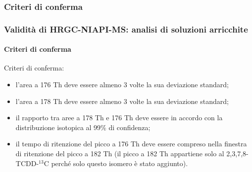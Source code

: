 \begin{frame}
\begin{description}
\end{description}

\end{frame}
\logo{}
\subsubsection{Criteri di conferma}\begin{frame}\frametitle{Validità di HRGC-NIAPI-MS: analisi di soluzioni arricchite}\framesubtitle{Criteri di conferma}


Criteri di conferma:\pause

\begin{itemize}
                                              \item l'area a 176 Th deve essere almeno 3 volte la sua deviazione standard;
                                              \item l'area a 178 Th deve essere almeno 3 volte la sua deviazione standard;
                                              \item il rapporto tra aree a 178 Th e 176 Th deve essere in accordo con la distribuzione isotopica al 99\% di confidenza;
                                              \item il tempo di  ritenzione del picco a 176 Th deve essere compreso nella finestra di ritenzione del picco a 182 Th (il picco a 182 Th appartiene solo al 2,3,7,8-TCDD-$^{13}$C perché solo questo isomero è stato aggiunto).
                                             \end{itemize} 


\end{frame}
